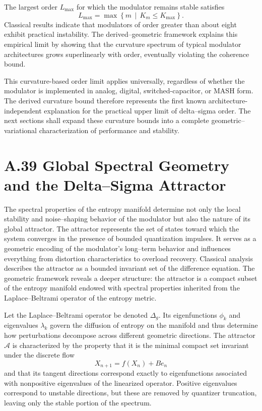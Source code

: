 The largest order \(L_{\mathrm{max}}\) for which the modulator remains stable satisfies
\[
L_{\mathrm{max}} = \max \left\{ m \, \middle| \, K_m \le K_{\mathrm{max}} \right\}.
\]
Classical results indicate that modulators of order greater than about eight exhibit practical instability. The derived–geometric framework explains this empirical limit by showing that the curvature spectrum of typical modulator architectures grows superlinearly with order, eventually violating the coherence bound.

This curvature-based order limit applies universally, regardless of whether the modulator is implemented in analog, digital, switched-capacitor, or MASH form. The derived curvature bound therefore represents the first known architecture-independent explanation for the practical upper limit of delta–sigma order. The next sections shall expand these curvature bounds into a complete geometric–variational characterization of performance and stability.

\section{A.39 Global Spectral Geometry and the Delta–Sigma Attractor}

The spectral properties of the entropy manifold determine not only the local stability and noise–shaping behavior of the modulator but also the nature of its global attractor. The attractor represents the set of states toward which the system converges in the presence of bounded quantization impulses. It serves as a geometric encoding of the modulator’s long–term behavior and influences everything from distortion characteristics to overload recovery. Classical analysis describes the attractor as a bounded invariant set of the difference equation. The geometric framework reveals a deeper structure: the attractor is a compact subset of the entropy manifold endowed with spectral properties inherited from the Laplace–Beltrami operator of the entropy metric.

Let the Laplace–Beltrami operator be denoted \(\Delta_g\). Its eigenfunctions \(\phi_k\) and eigenvalues \(\lambda_k\) govern the diffusion of entropy on the manifold and thus determine how perturbations decompose across different geometric directions. The attractor \(\mathcal{A}\) is characterized by the property that it is the minimal compact set invariant under the discrete flow
\[
X_{n+1} = f(X_n) + B e_n
\]
and that its tangent directions correspond exactly to eigenfunctions associated with nonpositive eigenvalues of the linearized operator. Positive eigenvalues correspond to unstable directions, but these are removed by quantizer truncation, leaving only the stable portion of the spectrum.

